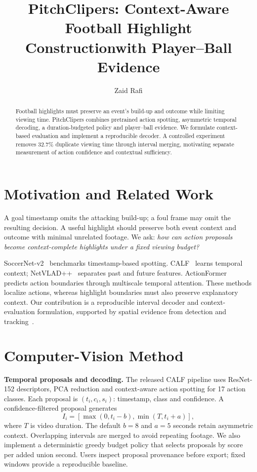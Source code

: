 \documentclass[10pt,twocolumn,letterpaper]{article}
\begin{document}
\title{PitchClipers: Context-Aware Football Highlight Construction\newline with Player--Ball Evidence}
\author{Zaid Rafi}
\maketitle
\begin{abstract}
Football highlights must preserve an event's build-up and outcome while limiting viewing time. PitchClipers combines pretrained action spotting, asymmetric temporal decoding, a duration-budgeted policy and player--ball evidence. We formulate context-based evaluation and implement a reproducible decoder. A controlled experiment removes 32.7\% duplicate viewing time through interval merging, motivating separate measurement of action confidence and contextual sufficiency.
\end{abstract}

\section{Motivation and Related Work}
A goal timestamp omits the attacking build-up; a foul frame may omit the resulting decision. A useful highlight should preserve both event context and outcome with minimal unrelated footage. We ask: \emph{how can action proposals become context-complete highlights under a fixed viewing budget?}

SoccerNet-v2~\cite{sn} benchmarks timestamp-based spotting. CALF~\cite{calf} learns temporal context; NetVLAD++~\cite{netvlad} separates past and future features. ActionFormer~\cite{actionformer} predicts action boundaries through multiscale temporal attention. These methods localize actions, whereas highlight boundaries must also preserve explanatory context. Our contribution is a reproducible interval decoder and context-evaluation formulation, supported by spatial evidence from detection and tracking~\cite{yolo,bytetrack}.

\section{Computer-Vision Method}
\textbf{Temporal proposals and decoding.} The released CALF pipeline uses ResNet-152 descriptors, PCA reduction and context-aware action spotting for 17 action classes. Each proposal is $(t_i,c_i,s_i)$: timestamp, class and confidence. A confidence-filtered proposal generates
\begin{equation}
 I_i=[\max(0,t_i-b),\min(T,t_i+a)],
\end{equation}
where $T$ is video duration. The default $b=8$ and $a=5$ seconds retain asymmetric context. Overlapping intervals are merged to avoid repeating footage. We also implement a deterministic greedy budget policy that selects proposals by score per added union second. Users inspect proposal provenance before export; fixed windows provide a reproducible baseline.
\end{document}

